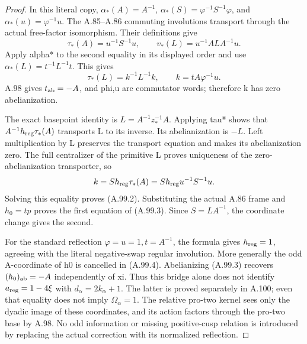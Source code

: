 \begin{proof}
In this literal copy,
\(\alpha_*(A)=A^{-1}\),
\(\alpha_*(S)=\varphi^{-1}S^{-1}\varphi\), and
\(\alpha_*(u)=\varphi^{-1}u\). The A.85--A.86 commuting
involutions transport through the actual free-factor isomorphism.
Their definitions give
\[
 \tau_*(A)=u^{-1}S^{-1}u,
 \qquad v_*(L)=u^{-1}ALA^{-1}u.
\]
Apply alpha* to the second equality in its displayed order and
use \(\alpha_*(L)=t^{-1}L^{-1}t\). This gives
\[
 \tau_*(L)=k^{-1}L^{-1}k,
 \qquad k=tA\varphi^{-1}u.
 \tag{A.99.4}
\]
A.98 gives \(t_{\rm ab}=-A\), and phi,u are commutator words;
therefore k has zero abelianization.

The exact basepoint identity is \(L=A^{-1}z_*^{-1}A\).
Applying tau* shows that
\(A^{-1}h_{\rm reg}\tau_*(A)\) transports L to its inverse.
Its abelianization is \(-L\). Left multiplication by L preserves
the transport equation and makes its abelianization zero.
The full centralizer of the primitive L proves uniqueness of the
zero-abelianization transporter, so
\[
 k=S h_{\rm reg}\tau_*(A)
      =S h_{\rm reg}u^{-1}S^{-1}u.
\]
Solving this equality proves (A.99.2). Substituting the actual
A.86 frame and \(h_0=tp\) proves the first equation of (A.99.3).
Since \(S=LA^{-1}\), the coordinate change gives the second.

For the standard reflection \(\varphi=u=1,t=A^{-1}\), the formula
gives \(h_{\rm reg}=1\), agreeing with the literal negative-swap
regular involution. More generally the odd A-coordinate of h0 is
cancelled in (A.99.4). Abelianizing (A.99.3) recovers
\((h_0)_{\rm ab}=-A\) independently of xi. Thus this bridge alone
does not identify \(a_{\rm reg}=1-4\xi\) with
\(d_\alpha=2k_\alpha+1\). The latter is proved separately in A.100;
even that equality does not imply \(\Omega_\alpha=1\).
The relative pro-two kernel sees only the dyadic image of these
coordinates, and its action factors through the pro-two base by
A.98. No odd information or missing positive-cusp relation is
introduced by replacing the actual correction with its normalized
reflection.
\end{proof}
